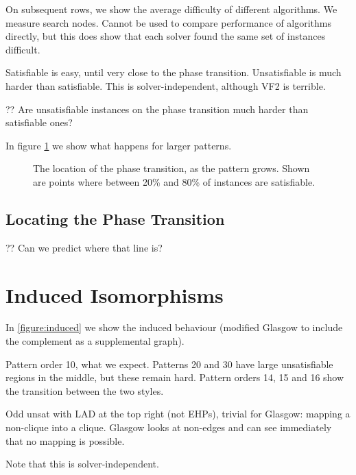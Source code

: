 \documentclass[letterpaper]{article}
\begin{document}
On subsequent rows, we show the average difficulty of different algorithms.  We measure search
nodes. Cannot be used to compare performance of algorithms directly, but this does show that each
solver found the same set of instances difficult.

Satisfiable is easy, until very close to the phase transition. Unsatisfiable is much harder than
satisfiable. This is solver-independent, although VF2 is terrible.

?? Are unsatisfiable instances on the phase transition much harder than satisfiable ones?

In figure \cref{figure:phase-transition-bands} we show what happens for larger patterns.

\begin{figure}[tb]
    
    \caption{The location of the phase transition, as the pattern grows. Shown are points where
    between 20\% and 80\% of instances are satisfiable.}
    \label{figure:phase-transition-bands}
\end{figure}

\lipsum[4]

\subsection{Locating the Phase Transition}

?? Can we predict where that line is?

\lipsum[5]

\lipsum[6]

\section{Induced Isomorphisms}

In \cref{figure:induced} we show the induced behaviour (modified Glasgow to include the complement
as a supplemental graph).

Pattern order 10, what we expect. Patterns 20 and 30 have large unsatisfiable regions in the middle,
but these remain hard. Pattern orders 14, 15 and 16 show the transition between the two styles.

Odd unsat with LAD at the top right (not EHPs), trivial for Glasgow: mapping a non-clique into a
clique. Glasgow looks at non-edges and can see immediately that no mapping is possible.

Note that this is solver-independent.

\lipsum[7]
\end{document}
